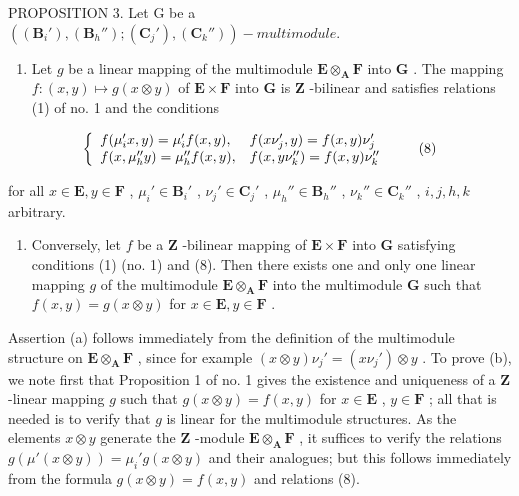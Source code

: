 PROPOSITION 3. Let G be a \(((\mathbf{B}_i'), (\mathbf{B}_h''); (\mathbf{C}_j'), (\mathbf{C}_k''))-multimodule.\)

\begin{enumerate}
\def\labelenumi{(\alph{enumi})}
\tightlist
\item
  Let \(g\) be a linear mapping of the multimodule \(\mathbf{E} \otimes_{\mathbf{A}} \mathbf{F}\) into \(\mathbf{G}\) . The mapping \(f: (x, y) \mapsto g(x \otimes y)\) of \(\mathbf{E} \times \mathbf{F}\) into \(\mathbf{G}\) is \(\mathbf{Z}\) -bilinear and satisfies relations (1) of no. 1 and the conditions
\end{enumerate}

\[
\left\{ \begin{array}{l l} f (\mu_ {i} ^ {\prime} x, y) = \mu_ {i} ^ {\prime} f (x, y), & f (x \nu_ {j} ^ {\prime}, y) = f (x, y) \nu_ {j} ^ {\prime} \\ f (x, \mu_ {h} ^ {\prime \prime} y) = \mu_ {h} ^ {\prime \prime} f (x, y), & f (x, y \nu_ {k} ^ {\prime \prime}) = f (x, y) \nu_ {k} ^ {\prime \prime} \end{array} \right.\tag{8}
\]

for all \(x \in \mathbf{E}, y \in \mathbf{F}\) , \(\mu_i' \in \mathbf{B}_i'\) , \(\nu_j' \in \mathbf{C}_j'\) , \(\mu_h'' \in \mathbf{B}_h''\) , \(\nu_k'' \in \mathbf{C}_{k}''\) , \(i, j, h, k\) arbitrary.

\begin{enumerate}
\def\labelenumi{(\alph{enumi})}
\setcounter{enumi}{1}
\tightlist
\item
  Conversely, let \(f\) be a \(\mathbf{Z}\) -bilinear mapping of \(\mathbf{E} \times \mathbf{F}\) into \(\mathbf{G}\) satisfying conditions (1) (no. 1) and (8). Then there exists one and only one linear mapping \(g\) of the multimodule \(\mathbf{E} \otimes_{\mathbf{A}} \mathbf{F}\) into the multimodule \(\mathbf{G}\) such that \(f(x, y) = g(x \otimes y)\) for \(x \in \mathbf{E}, y \in \mathbf{F}\) .
\end{enumerate}

Assertion (a) follows immediately from the definition of the multimodule structure on \(\mathbf{E} \otimes_{\mathbf{A}} \mathbf{F}\) , since for example \((x \otimes y)\nu_j' = (x\nu_j') \otimes y\) . To prove (b), we note first that Proposition 1 of no. 1 gives the existence and uniqueness of a \(\mathbf{Z}\) -linear mapping \(g\) such that \(g(x \otimes y) = f(x, y)\) for \(x \in \mathbf{E}\) , \(y \in \mathbf{F}\) ; all that is needed is to verify that \(g\) is linear for the multimodule structures. As the elements \(x \otimes y\) generate the \(\mathbf{Z}\) -module \(\mathbf{E} \otimes_{\mathbf{A}} \mathbf{F}\) , it suffices to verify the relations \(g(\mu'(x \otimes y)) = \mu_i' g(x \otimes y)\) and their analogues; but this follows immediately from the formula \(g(x \otimes y) = f(x, y)\) and relations (8).

